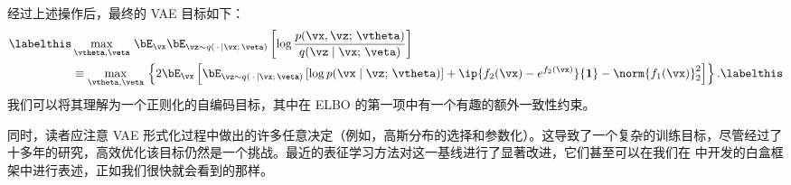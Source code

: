 \documentclass[../../book-main_zh.tex]{subfiles}
\begin{document}
经过上述操作后，最终的 VAE 目标如下：
\begin{align*}\labelthis\label{eq:elbo-objective}
    &\max_{\vtheta, \veta}\,
    \bE_{\vx}
    \bE_{\vz \sim q(\,\cdot\, \mid \vx ;\, \veta)} \left[
        \log \frac{p(\vx, \vz;\, \vtheta)}{q(\vz \mid \vx;\, \veta)}
    \right]\\
    &\equiv
    \max_{\vtheta, \veta}\,
    \left\{
        2\bE_{\vx}\left[
            \bE_{\vz \sim q(\,\cdot\, \mid \vx ;\, \veta)} \left[
                \log p(\vx \mid \vz;\, \vtheta)
            \right]
            + \ip{ f_2(\vx) - e^{f_2(\vx)}}{\mathbf{1}}
            - \norm{f_1(\vx)}_2^2
        \right]
    \right\}. \labelthis \label{eq:elbo-for-gaussians}
\end{align*}
我们可以将其理解为一个正则化的自编码目标，其中在 ELBO 的第一项中有一个有趣的额外一致性约束。

同时，读者应注意 VAE 形式化过程中做出的许多任意决定（例如，高斯分布的选择和参数化）。这导致了一个复杂的训练目标，尽管经过了十多年的研究，高效优化该目标仍然是一个挑战。最近的表征学习方法对这一基线进行了显著改进，它们甚至可以在我们在  中开发的白盒框架中进行表述，正如我们很快就会看到的那样。

\end{document}
